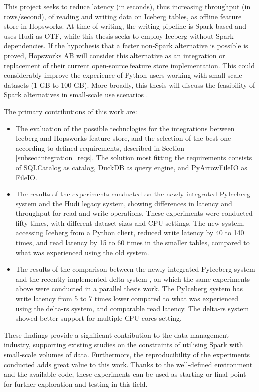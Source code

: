 This project seeks to reduce latency (in seconds), thus increasing throughput (in rows/second), of reading and writing data on Iceberg tables, as offline feature store in Hopsworks. At time of writing, the writing pipeline is Spark-based and uses Hudi as \gls{OTF}, while this thesis seeks to employ Iceberg without Spark-dependencies. If the hypothesis that a faster non-Spark alternative is possible is proved, Hopsworks AB will consider this alternative as an integration or replacement of their current open-source feature store implementation. This could considerably improve the experience of Python users working with small-scale datasets (1 GB to 100 GB). More broadly, this thesis will discuss the feasibility of Spark alternatives in small-scale use scenarios \cite{manfrediReducingReadWrite2024}.


The primary contributions of this work are:
\begin{itemize}
    \item The evaluation of the possible technologies for the integrations between Iceberg and Hopsworks feature store, and the selection of the best one according to defined requirements, described in Section \ref{subsec:integration_reqs}. The solution most fitting the requirements consists of SQLCatalog as catalog, DuckDB as query engine, and PyArrowFileIO as FileIO.
    \item The results of the experiments conducted on the newly integrated PyIceberg system and the Hudi legacy system, showing differences in latency and throughput for read and write operations. These experiments were conducted fifty times, with different dataset sizes and \gls{CPU} settings. The new system, accessing Iceberg from a Python client, reduced write latency by 40 to 140 times, and read latency by 15 to 60 times in the smaller tables, compared to what was experienced using the old system.
    \item The results of the comparison between the newly integrated PyIceberg system and the recently implemented delta system \cite{manfrediReducingReadWrite2024}, on which the same experiments above were conducted in a parallel thesis work. The PyIceberg system has write latency from 5 to 7 times lower compared to what was experienced using the delta-rs system, and comparable read latency. The delta-rs system showed better support for multiple \gls{CPU} cores setting.
\end{itemize}

These findings provide a significant contribution to the data management industry, supporting existing studies on the constraints of utilising Spark with small-scale volumes of data. Furthermore, the reproducibility of the experiments conducted adds great value to this work. Thanks to the well-defined environment and the available code, these experiments can be used as starting or final point for further exploration and testing in this field. 